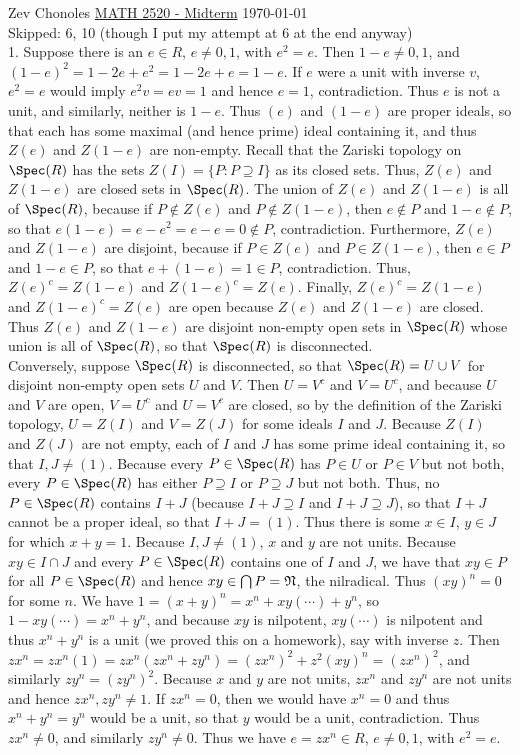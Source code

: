\documentclass[11pt]{article}
\begin{document}
Zev Chonoles \hfill 
\underline{MATH 2520 - Midterm} \hfill \today\\

Skipped: 6, 10 (though I put my attempt at 6 at the end anyway)\\

\num{1.} Suppose there is an $e\in R$, $e\neq0,1$, with $e^2=e$. Then
$1-e\neq0,1$, and $(1-e)^2=1-2e+e^2=1-2e+e=1-e$. If $e$ were a unit
with inverse $v$, $e^2=e$ would imply $e^2v=ev=1$ and hence $e=1$,
contradiction. Thus $e$ is not a unit, and similarly, neither is $1-e$. Thus
$(e)$ and $(1-e)$ are proper ideals, so that each has some maximal (and hence
prime) ideal containing it, and thus $Z(e)$ and $Z(1-e)$ are non-empty. Recall
that the Zariski topology on $\Spec(R)$ has the sets $Z(I)=\{P:P\supseteq
I\}$ as its closed sets. Thus, $Z(e)$ and $Z(1-e)$ are closed sets in
$\Spec(R)$. The union of $Z(e)$ and $Z(1-e)$ is all of $\Spec(R)$, because
if $P\notin Z(e)$ and $P\notin Z(1-e)$, then $e\notin P$ and $1-e\notin P$,
so that $e(1-e)=e-e^2=e-e=0\notin P$, contradiction. Furthermore, $Z(e)$ and
$Z(1-e)$ are disjoint, because if $P\in Z(e)$ and $P\in Z(1-e)$, then $e\in P$
and $1-e\in P$, so that $e+(1-e)=1\in P$, contradiction. Thus, $Z(e)^c=Z(1-e)$
and $Z(1-e)^c=Z(e)$. Finally, $Z(e)^c=Z(1-e)$ and $Z(1-e)^c=Z(e)$ are open
because $Z(e)$ and $Z(1-e)$ are closed. Thus $Z(e)$ and $Z(1-e)$ are disjoint
non-empty open sets in $\Spec(R)$ whose union is all of $\Spec(R)$, so that
$\Spec(R)$ is disconnected.        \\

Conversely, suppose $\Spec(R)$ is disconnected, so that $\Spec(R)=U\cup V$
for disjoint non-empty open sets $U$ and $V$. Then $U=V^c$ and $V=U^c$,
and because $U$ and $V$ are open, $V=U^c$ and $U=V^c$ are closed, so by the
definition of the Zariski topology, $U=Z(I)$ and $V=Z(J)$ for some ideals
$I$ and $J$. Because $Z(I)$ and $Z(J)$ are not empty, each of $I$ and $J$
has some prime ideal containing it, so that $I,J\neq(1)$. Because every
$P\in\Spec(R)$ has $P\in U$ or $P\in V$ but not both, every $P\in\Spec(R)$
has either $P\supseteq I$ or $P\supseteq J$ but not both. Thus, no
$P\in\Spec(R)$ contains $I+J$ (because $I+J\supseteq I$ and $I+J\supseteq
J$), so that $I+J$ cannot be a proper ideal, so that $I+J=(1)$. Thus there
is some $x\in I$, $y\in J$ for which $x+y=1$. Because $I,J\neq(1)$, $x$
and $y$ are not units. Because $xy\in I\cap J$ and every $P\in\Spec(R)$
contains one of $I$ and $J$, we have that $xy\in P$ for all $P\in\Spec(R)$
and hence $xy\in\bigcap P = \frak{N}$, the nilradical. Thus $(xy)^n=0$ for
some $n$. We have $1=(x+y)^n=x^n+xy(\cdots)+y^n$, so $1-xy(\cdots)=x^n+y^n$,
and because $xy$ is nilpotent, $xy(\cdots)$ is nilpotent and thus $x^n+y^n$
is a unit (we proved this on a homework), say with inverse $z$. Then
$zx^n=zx^n(1)=zx^n(zx^n+zy^n)=(zx^n)^2+z^2(xy)^n=(zx^n)^2$, and similarly
$zy^n=(zy^n)^2$. Because $x$ and $y$ are not units, $zx^n$ and $zy^n$
are not units and hence $zx^n,zy^n\neq1$. If $zx^n=0$, then we would have
$x^n=0$ and thus $x^n+y^n=y^n$ would be a unit, so that $y$ would be a unit,
contradiction. Thus $zx^n\neq0$, and similarly $zy^n\neq0$. Thus we have
$e=zx^n\in R$, $e\neq0,1$, with $e^2=e$. \\
\end{document}
